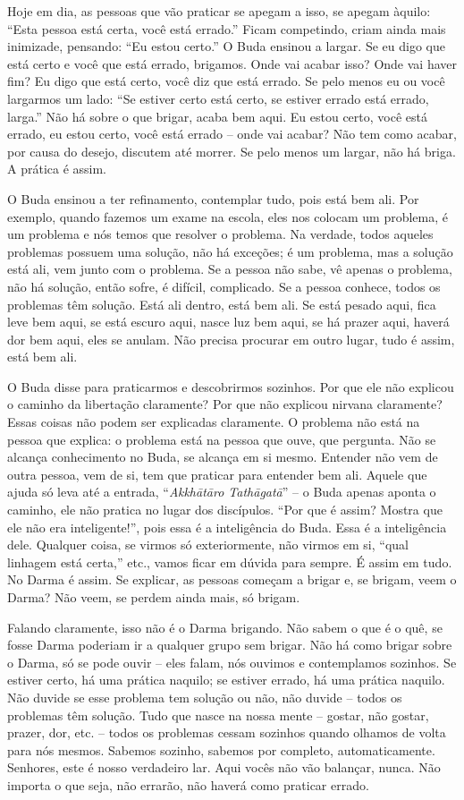 Hoje em dia, as pessoas que vão praticar se apegam a isso, se apegam
àquilo: “Esta pessoa está certa, você está errado.” Ficam competindo,
criam ainda mais inimizade, pensando: “Eu estou certo.” O Buda ensinou
a largar. Se eu digo que está certo e você que está errado, brigamos.
Onde vai acabar isso? Onde vai haver fim? Eu digo que está certo, você
diz que está errado. Se pelo menos eu ou você largarmos um lado: “Se
estiver certo está certo, se estiver errado está errado, larga.” Não há
sobre o que brigar, acaba bem aqui. Eu estou certo, você está errado,
eu estou certo, você está errado – onde vai acabar? Não tem como
acabar, por causa do desejo, discutem até morrer. Se pelo menos um
largar, não há briga. A prática é assim. 

O Buda ensinou a ter refinamento, contemplar tudo, pois está bem
ali. Por exemplo, quando fazemos um exame na escola, eles nos colocam
um problema, é um problema e nós temos que resolver o problema. Na
verdade, todos aqueles problemas possuem uma solução, não há exceções;
é um problema, mas a solução está ali, vem junto com o problema. Se a
pessoa não sabe, vê apenas o problema, não há solução, então sofre, é
difícil, complicado. Se a pessoa conhece, todos os problemas têm
solução. Está ali dentro, está bem ali. Se está pesado aqui, fica leve
bem aqui, se está escuro aqui, nasce luz bem aqui, se há prazer aqui,
haverá dor bem aqui, eles se anulam. Não precisa procurar em outro
lugar, tudo é assim, está bem ali. 

O Buda disse para praticarmos e descobrirmos sozinhos. Por que ele
não explicou o caminho da libertação claramente? Por que não explicou
nirvana claramente? Essas coisas não podem ser explicadas claramente. O
problema não está na pessoa que explica: o problema está na pessoa que
ouve, que pergunta. Não se alcança conhecimento no Buda, se alcança em
si mesmo. Entender não vem de outra pessoa, vem de si, tem que praticar
para entender bem ali. Aquele que ajuda só leva até a entrada,
“\emph{Akkhātāro Tathāgatā}” – o Buda apenas aponta o
caminho, ele não pratica no lugar dos discípulos. “Por que é assim?
Mostra que ele não era inteligente!”, pois essa é a inteligência do
Buda. Essa é a inteligência dele. Qualquer coisa, se virmos só
exteriormente, não virmos em si, “qual linhagem está certa,” etc.,
vamos ficar em dúvida para sempre. É assim em tudo. No Darma é assim.
Se explicar, as pessoas começam a brigar e, se brigam, veem o Darma?
Não veem, se perdem ainda mais, só brigam. 

Falando claramente, isso não é o Darma brigando. Não sabem o que é o
quê, se fosse Darma poderiam ir a qualquer grupo sem brigar. Não há
como brigar sobre o Darma, só se pode ouvir – eles falam, nós ouvimos e
contemplamos sozinhos. Se estiver certo, há uma prática naquilo; se
estiver errado, há uma prática naquilo. Não duvide se esse problema tem
solução ou não, não duvide – todos os problemas têm solução. Tudo que
nasce na nossa mente – gostar, não gostar, prazer, dor, etc. – todos os
problemas cessam sozinhos quando olhamos de volta para nós mesmos.
Sabemos sozinho, sabemos por completo, automaticamente. Senhores, este
é nosso verdadeiro lar. Aqui vocês não vão balançar, nunca. Não importa
o que seja, não errarão, não haverá como praticar errado. 

